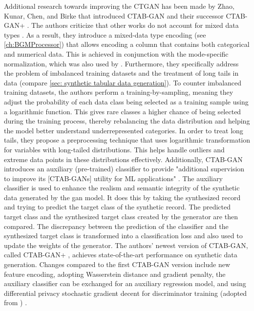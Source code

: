 Additional research towards improving the CTGAN has been made by Zhao, Kunar, Chen, and Birke that introduced CTAB-GAN \cite{zhao2021CTABGANEffectiveTablea} and their successor CTAB-GAN+ \cite{zhao2022CTABGANEnhancingTabular}.
The authors criticize that other works do not account for mixed data types \cite{zhao2022CTABGANEnhancingTabular}.
As a result, they introduce a mixed-data type encoding (see \autoref{ch:BGMProcessor}) that allows encoding a column that contains both categorical and numerical data.
This is achieved in conjunction with the mode-specific normalization, which was also used by \textcite{xu2018SynthesizingTabularData, xu2019ModelingTabularData}.
Furthermore, they specifically address the problem of imbalanced training datasets and the treatment of long tails in data (compare \autoref{sec: synthetic tabular data generation}).
To counter imbalanced training datasets, the authors perform a training-by-sampling, meaning they adjust the probability of each data class being selected as a training sample using a logarithmic function.
This gives rare classes a higher chance of being selected during the training process, thereby rebalancing the data distribution and helping the model better understand underrepresented categories.
In order to treat long tails, they propose a preprocessing technique that uses logarithmic transformation for variables with long-tailed distributions. 
This helps handle outliers and extreme data points in these distributions effectively.
Additionally, CTAB-GAN introduces an auxiliary (pre-trained) classifier to provide "additional supervision to improve its [CTAB-GANs] utility for ML applications" \cite[p. 2]{zhao2021CTABGANEffectiveTablea}.
The auxiliary classifier is used to enhance the realism and semantic integrity of the synthetic data generated by the \gls{gan} model. 
It does this by taking the synthesized record and trying to predict the target class of the synthetic record.
The predicted target class and the synthesized target class created by the generator are then compared.
The discrepancy between the prediction of the classifier and the synthesized target class is transformed into a classification loss and also used to update the weights of the generator.
The authors' newest version of CTAB-GAN, called CTAB-GAN+ \cite{zhao2022CTABGANEnhancingTabular}, achieves state-of-the-art performance on synthetic data generation.
Changes compared to the first CTAB-GAN version include new feature encoding, adopting Wasserstein distance and gradient penalty, the auxiliary classifier can be exchanged for an auxiliary regression model,
and using differential privacy stochastic gradient decent \cite{abadi2016DeepLearningDifferential} for discriminator training (adopted from \cite{jordon2018PATEGANGeneratingSynthetic}) \cite{zhao2022CTABGANEnhancingTabular}.

